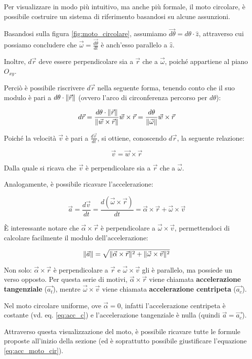 Per visualizzare in modo più intuitivo, ma anche più formale, il
moto circolare, è possibile costruire un sistema di riferimento
basandosi su alcune assunzioni.

Basandosi sulla figura \ref{fig:moto_circolare}, assumiamo
$\vec{d\theta} = d\theta \cdot \hat{z}$, attraverso cui
possiamo concludere che $\vec{\omega}=\frac{\vec{d\theta}}{dt}$ è anch'esso
parallelo a $\hat{z}$.

Inoltre, $d\vec{r}$ deve essere perpendicolare sia a $\vec{r}$ che
a $\vec{\omega}$, poiché appartiene al piano $O_{xy}$.

Perciò è possibile riscrivere $d\vec{r}$ nella seguente forma, tenendo
conto che il suo modulo è pari a $d\theta \cdot \lVert \vec{r} \rVert$ (ovvero
l'arco di circonferenza percorso per $d\theta$):

\begin{equation*}
    d\vec{r}=\frac{d\theta \cdot \lVert \vec{r} \rVert}{\lVert \vec{w} \times
    \vec{r} \rVert} \vec{w} \times \vec{r} =
    \frac{d\theta}{\lVert \vec{\omega} \rVert} \vec{w} \times \vec{r}
\end{equation*}

Poiché la velocità $\vec{v}$ è pari a $\frac{d\vec{r}}{dt}$, si ottiene,
conoscendo $d\vec{r}$, la seguente relazione:

\begin{equation}
    \vec{v}=\vec{w}\times\vec{r}
\end{equation}

Dalla quale si ricava che $\vec{v}$ è perpendicolare sia a $\vec{r}$ che
a $\vec{\omega}$.

Analogamente, è possibile ricavare l'accelerazione:

\begin{equation}
    \vec{a}=\frac{d\vec{v}}{dt}=\frac{d(\vec{\omega}
    \times \vec{r})}{dt}=\vec{\alpha} \times \vec{r}
    + \vec{\omega} \times \vec{v}
\end{equation}

È interessante notare che $\vec{\alpha} \times \vec{r}$
è perpendicolare a $\vec{\omega} \times \vec{v}$, permettendoci
di calcolare facilmente il modulo dell'accelerazione:

\begin{equation}
    \lVert \vec{a} \rVert = \sqrt{\lVert \vec{\alpha} \times \vec{r} \rVert^2 + \lVert \vec{\omega} \times \vec{v} \rVert^2}
\end{equation}

Non solo: $\vec{\alpha} \times \vec{r}$ è perpendicolare a $\vec{r}$ e
$\vec{\omega} \times \vec{v}$ gli è parallelo, ma possiede un verso opposto.
Per questa serie di motivi, $\vec{\alpha} \times \vec{r}$ viene chiamata
\textbf{accelerazione tangenziale} ($\vec{a_t}$), mentre
$\vec{\omega} \times \vec{v}$ viene chiamata \textbf{accelerazione centripeta}
($\vec{a_c}$).

Nel moto circolare uniforme, ove $\vec{\alpha}=0$, infatti l'accelerazione
centripeta è costante (vd. eq. \ref{eq:acc_c}) e l'accelerazione
tangenziale è nulla (quindi $\vec{a}=\vec{a_c}$).

Attraverso questa visualizzazione del moto, è possibile ricavare tutte
le formule proposte all'inizio della sezione (ed è soprattutto
possibile giustificare l'equazione \ref{eq:acc_moto_cir}).
